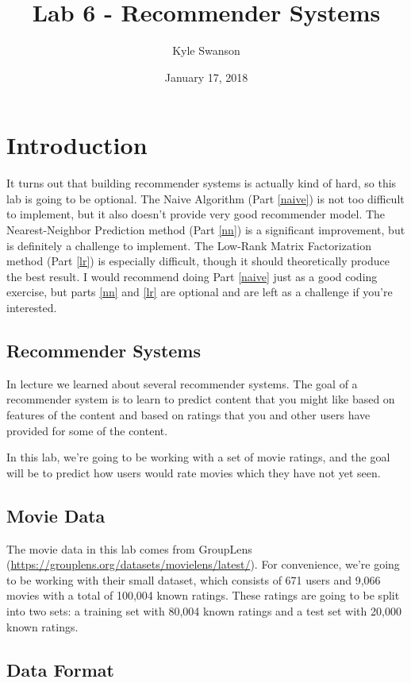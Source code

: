 \documentclass{article}
\title{Lab 6 - Recommender Systems}
\author{Kyle Swanson}
\date{January 17, 2018}
\begin{document}
\maketitle

\section{Introduction}

It turns out that building recommender systems is actually kind of hard, so this lab is going to be optional. The Naive Algorithm (Part \ref{naive}) is not too difficult to implement, but it also doesn't provide very good recommender model. The Nearest-Neighbor Prediction method (Part \ref{nn}) is a significant improvement, but is definitely a challenge to implement. The Low-Rank Matrix Factorization method (Part \ref{lr}) is especially difficult, though it should theoretically produce the best result. I would recommend doing Part \ref{naive} just as a good coding exercise, but parts \ref{nn} and \ref{lr} are optional and are left as a challenge if you're interested.

\subsection{Recommender Systems}

In lecture we learned about several recommender systems. The goal of a recommender system is to learn to predict content that you might like based on features of the content and based on ratings that you and other users have provided for some of the content.

In this lab, we're going to be working with a set of movie ratings, and the goal will be to predict how users would rate movies which they have not yet seen.

\subsection{Movie Data}

The movie data in this lab comes from GroupLens (\url{https://grouplens.org/datasets/movielens/latest/}). For convenience, we're going to be working with their small dataset, which consists of 671 users and 9,066 movies with a total of 100,004 known ratings. These ratings are going to be split into two sets: a training set with 80,004 known ratings and a test set with 20,000 known ratings.

\subsection{Data Format}
\end{document}
